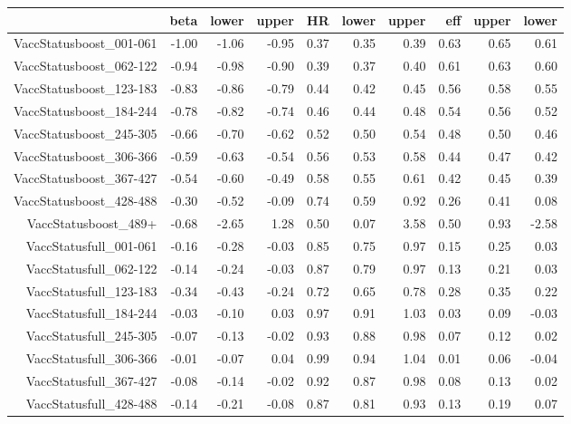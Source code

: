 \begin{table}[ht]
\centering
\begin{tabular}{rrrrrrrrrr}
  \hline
 & beta & lower & upper & HR & lower & upper & eff & upper & lower \\ 
  \hline
VaccStatusboost\_001-061 & -1.00 & -1.06 & -0.95 & 0.37 & 0.35 & 0.39 & 0.63 & 0.65 & 0.61 \\ 
  VaccStatusboost\_062-122 & -0.94 & -0.98 & -0.90 & 0.39 & 0.37 & 0.40 & 0.61 & 0.63 & 0.60 \\ 
  VaccStatusboost\_123-183 & -0.83 & -0.86 & -0.79 & 0.44 & 0.42 & 0.45 & 0.56 & 0.58 & 0.55 \\ 
  VaccStatusboost\_184-244 & -0.78 & -0.82 & -0.74 & 0.46 & 0.44 & 0.48 & 0.54 & 0.56 & 0.52 \\ 
  VaccStatusboost\_245-305 & -0.66 & -0.70 & -0.62 & 0.52 & 0.50 & 0.54 & 0.48 & 0.50 & 0.46 \\ 
  VaccStatusboost\_306-366 & -0.59 & -0.63 & -0.54 & 0.56 & 0.53 & 0.58 & 0.44 & 0.47 & 0.42 \\ 
  VaccStatusboost\_367-427 & -0.54 & -0.60 & -0.49 & 0.58 & 0.55 & 0.61 & 0.42 & 0.45 & 0.39 \\ 
  VaccStatusboost\_428-488 & -0.30 & -0.52 & -0.09 & 0.74 & 0.59 & 0.92 & 0.26 & 0.41 & 0.08 \\ 
  VaccStatusboost\_489+ & -0.68 & -2.65 & 1.28 & 0.50 & 0.07 & 3.58 & 0.50 & 0.93 & -2.58 \\ 
  VaccStatusfull\_001-061 & -0.16 & -0.28 & -0.03 & 0.85 & 0.75 & 0.97 & 0.15 & 0.25 & 0.03 \\ 
  VaccStatusfull\_062-122 & -0.14 & -0.24 & -0.03 & 0.87 & 0.79 & 0.97 & 0.13 & 0.21 & 0.03 \\ 
  VaccStatusfull\_123-183 & -0.34 & -0.43 & -0.24 & 0.72 & 0.65 & 0.78 & 0.28 & 0.35 & 0.22 \\ 
  VaccStatusfull\_184-244 & -0.03 & -0.10 & 0.03 & 0.97 & 0.91 & 1.03 & 0.03 & 0.09 & -0.03 \\ 
  VaccStatusfull\_245-305 & -0.07 & -0.13 & -0.02 & 0.93 & 0.88 & 0.98 & 0.07 & 0.12 & 0.02 \\ 
  VaccStatusfull\_306-366 & -0.01 & -0.07 & 0.04 & 0.99 & 0.94 & 1.04 & 0.01 & 0.06 & -0.04 \\ 
  VaccStatusfull\_367-427 & -0.08 & -0.14 & -0.02 & 0.92 & 0.87 & 0.98 & 0.08 & 0.13 & 0.02 \\ 
  VaccStatusfull\_428-488 & -0.14 & -0.21 & -0.08 & 0.87 & 0.81 & 0.93 & 0.13 & 0.19 & 0.07 \\ 

\end{tabular}
\end{table}
